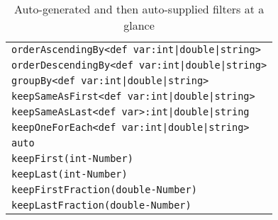 \begin{table}[htbp]
\centering
\begin{tabular}{|l|}
\hline
\texttt{orderAscendingBy<def var:int|double|string>}\\
\texttt{orderDescendingBy<def var:int|double|string>}\\
\texttt{groupBy<def var:int|double|string>}\\
\texttt{keepSameAsFirst<def var:int|double|string>}\\
\texttt{keepSameAsLast<def var>:int|double|string}\\
\texttt{keepOneForEach<def var:int|double|string>}\\
\texttt{auto}\\
\hline
\texttt{keepFirst(int-Number)}\\
\texttt{keepLast(int-Number)}\\
\texttt{keepFirstFraction(double-Number)}\\
\texttt{keepLastFraction(double-Number)}\\
\hline
\end{tabular}
\caption{Auto-generated and then auto-supplied filters at a glance}
\label{filterstab}
\end{table}


